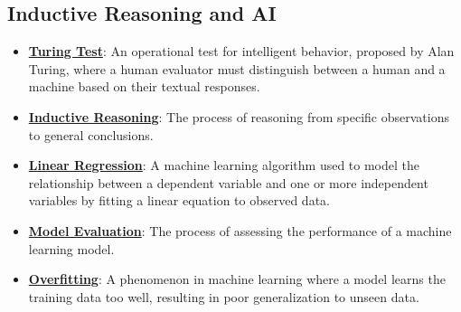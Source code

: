 \documentclass{article}%
\begin{document}
\subsection{Inductive Reasoning and AI}%
\label{subsec:InductiveReasoningandAI}%
\begin{itemize}[leftmargin=*]%
\item \href{\url{https://purdue.brightspace.com/d2l/common/assets/pdfjs-d2l-dist/1.0.14-legacy/web/viewer.html?file=\%252Fcontent\%252Fenforced\%252F1095467-wl.202510.CS.24300.001\%252F02L2-Intro.pdf\%253Fou\%253D1095467\&lang=en-us\&container=d2l-fileviewer-rendered-pdf\&fullscreen=d2l-fileviewer-rendered-pdf-dialog\&height=667}#page=6}{\textbf{Turing Test}}: An operational test for intelligent behavior, proposed by Alan Turing, where a human evaluator must distinguish between a human and a machine based on their textual responses.%
\item \href{\url{https://purdue.brightspace.com/d2l/common/assets/pdfjs-d2l-dist/1.0.14-legacy/web/viewer.html?file=\%252Fcontent\%252Fenforced\%252F1095467-wl.202510.CS.24300.001\%252F05L2-ML\%20Basics.pdf\%253Fou\%253D1095467\&lang=en-us\&container=d2l-fileviewer-rendered-pdf\&fullscreen=d2l-fileviewer-rendered-pdf-dialog\&height=667}#page=3}{\textbf{Inductive Reasoning}}: The process of reasoning from specific observations to general conclusions.%
\item \href{\url{https://purdue.brightspace.com/d2l/common/assets/pdfjs-d2l-dist/1.0.14-legacy/web/viewer.html?file=\%252Fcontent\%252Fenforced\%252F1095467-wl.202510.CS.24300.001\%252F05L2-ML\%20Basics.pdf\%253Fou\%253D1095467\&lang=en-us\&container=d2l-fileviewer-rendered-pdf\&fullscreen=d2l-fileviewer-rendered-pdf-dialog\&height=667}#page=6}{\textbf{Linear Regression}}: A machine learning algorithm used to model the relationship between a dependent variable and one or more independent variables by fitting a linear equation to observed data.%
\item \href{\url{https://purdue.brightspace.com/d2l/common/assets/pdfjs-d2l-dist/1.0.14-legacy/web/viewer.html?file=\%252Fcontent\%252Fenforced\%252F1095467-wl.202510.CS.24300.001\%252F05L2-ML\%20Basics.pdf\%253Fou\%253D1095467\&lang=en-us\&container=d2l-fileviewer-rendered-pdf\&fullscreen=d2l-fileviewer-rendered-pdf-dialog\&height=667}#page=8}{\textbf{Model Evaluation}}: The process of assessing the performance of a machine learning model.%
\item \href{\url{https://purdue.brightspace.com/d2l/common/assets/pdfjs-d2l-dist/1.0.14-legacy/web/viewer.html?file=\%252Fcontent\%252Fenforced\%252F1095467-wl.202510.CS.24300.001\%252F05L2-ML\%20Basics.pdf\%253Fou\%253D1095467\&lang=en-us\&container=d2l-fileviewer-rendered-pdf\&fullscreen=d2l-fileviewer-rendered-pdf-dialog\&height=667}#page=14}{\textbf{Overfitting}}: A phenomenon in machine learning where a model learns the training data too well, resulting in poor generalization to unseen data.%

\end{itemize}
\end{document}
